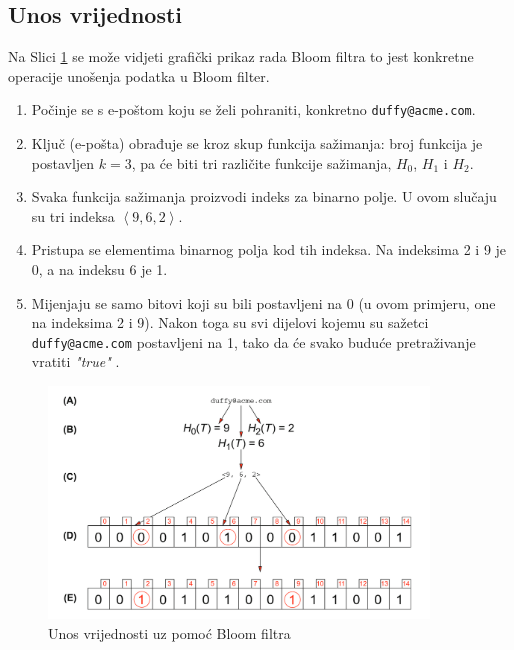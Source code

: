 \documentclass{foi}
\begin{document}
\subsection{Unos vrijednosti}

Na Slici \ref{fig:vremena4} se može vidjeti grafički prikaz rada Bloom filtra to jest konkretne operacije unošenja podatka u Bloom filter.

\begin{enumerate}[label=\Alph*)]

\item Počinje se s e-poštom koju se želi pohraniti, konkretno \texttt{duffy@acme.com}.

\item Ključ (e-pošta) obrađuje se kroz skup funkcija sažimanja: broj funkcija je postavljen $k=3$, pa će biti tri različite funkcije sažimanja, $H_0$, $H_1$ i $H_2$.

\item Svaka funkcija sažimanja proizvodi indeks za binarno polje. U ovom slučaju su tri indeksa $ \left\langle 9, 6, 2 \right\rangle$.

\item Pristupa se elementima binarnog polja kod tih indeksa. Na indeksima 2 i 9 je 0, a na indeksu 6 je 1.

\item Mijenjaju se samo bitovi koji su bili postavljeni na 0 (u ovom primjeru, one na indeksima 2 i 9). Nakon toga su svi dijelovi kojemu su sažetci \texttt{duffy@acme.com} postavljeni na 1, tako da će svako buduće pretraživanje vratiti \textit{"true"} \cite{la2021advanced}.

\end{enumerate}

\begin{figure}[H]
    \centering
    \includegraphics[width=0.9\textwidth, frame]{slike/input__.png}
    \caption{Unos vrijednosti uz pomoć Bloom filtra \cite{la2021advanced}}
    \label{fig:vremena4}
\end{figure}
\end{document}
